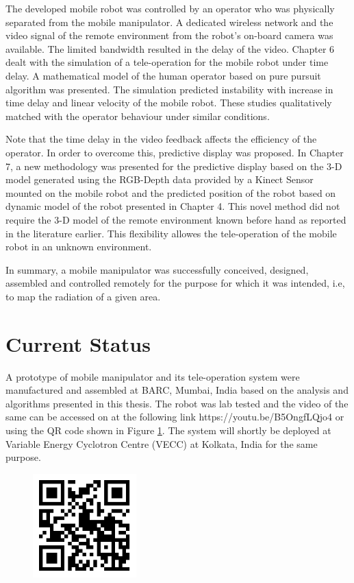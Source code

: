 The developed mobile robot was controlled by an operator who was  physically separated from the mobile manipulator. A dedicated wireless network and the video signal of the remote environment from the robot's on-board camera was available. The limited bandwidth resulted in the delay of the video. 
Chapter 6 dealt with the simulation of a tele-operation for the mobile robot under time delay.
 A mathematical model of the human operator based on pure pursuit algorithm was presented. 
 The simulation  predicted instability with increase in time delay and linear velocity of the mobile robot.
  These studies qualitatively matched with the operator behaviour under similar conditions.

   Note that the time delay in the video feedback affects the efficiency of the operator. 
   In order to overcome this, predictive display was proposed.
   In Chapter 7,  a new methodology was presented for the predictive display based on the 3-D model generated using the RGB-Depth data provided by a Kinect Sensor mounted on the mobile robot and the predicted position of the robot based on dynamic model of the robot presented in Chapter 4.
   This novel method did not require  the 3-D model of the remote environment known before hand as reported in the literature earlier.
   This flexibility allowes the tele-operation of  the mobile robot in an unknown environment. 
   
   In summary, a mobile manipulator was successfully conceived, designed, assembled and controlled remotely  for the purpose for which it was intended, i.e, to map the radiation of a given area.
   
   \section{Current Status} 
   A prototype of  mobile manipulator and its tele-operation system were   manufactured and assembled at BARC, Mumbai, India based on the analysis and algorithms presented in this thesis. The robot was lab tested and the video of the same can be accessed on at the following link https://youtu.be/B5OngfLQjo4 or using the QR code shown in Figure \ref{fig:QR}. The system will  shortly  be deployed at Variable Energy Cyclotron Centre (VECC) at Kolkata, India for the same purpose. 
\begin{figure}[h]
	\centering
	\includegraphics[height=4cm]{Chapter8/figure/qrcode}
	\label{fig:QR}
\end{figure}

